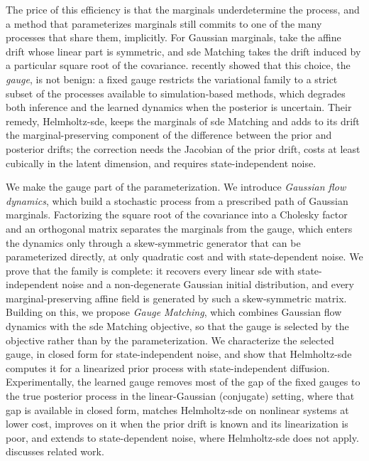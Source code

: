 \documentclass{article} %
\begin{document}
The price of this efficiency is that the marginals underdetermine the process, and a method that parameterizes marginals still commits to one of the many processes that share them, implicitly. For Gaussian marginals, \citet{course2023amortized,course2023state} take the affine drift whose linear part is symmetric, and \gls{sde} Matching \citep{bartosh2025sde} takes the drift induced by a particular square root of the covariance. \citet{smith2026closing} recently showed that this choice, the \emph{gauge}, is not benign: a fixed gauge restricts the variational family to a strict subset of the processes available to simulation-based methods, which degrades both inference and the learned dynamics when the posterior is uncertain. Their remedy, Helmholtz-\gls{sde}, keeps the marginals of \gls{sde} Matching and adds to its drift the marginal-preserving component of the difference between the prior and posterior drifts; the correction needs the Jacobian of the prior drift, costs at least cubically in the latent dimension, and requires state-independent noise.

We make the gauge part of the parameterization. We introduce \emph{Gaussian flow dynamics}, which build a stochastic process from a prescribed path of Gaussian marginals. Factorizing the square root of the covariance into a Cholesky factor and an orthogonal matrix separates the marginals from the gauge, which enters the dynamics only through a skew-symmetric generator that can be parameterized directly, at only quadratic cost and with state-dependent noise. We prove that the family is complete: it recovers every linear \gls{sde} with state-independent noise and a non-degenerate Gaussian initial distribution, and every marginal-preserving affine field is generated by such a skew-symmetric matrix. Building on this, we propose \emph{Gauge Matching}, which combines Gaussian flow dynamics with the \gls{sde} Matching objective, so that the gauge is selected by the objective rather than by the parameterization. We characterize the selected gauge, in closed form for state-independent noise, and show that Helmholtz-\gls{sde} computes it for a linearized prior process with state-independent diffusion. Experimentally, the learned gauge removes most of the gap of the fixed gauges to the true posterior process in the linear-Gaussian (conjugate) setting, where that gap is available in closed form, matches Helmholtz-\gls{sde} on nonlinear systems at lower cost, improves on it when the prior drift is known and its linearization is poor, and extends to state-dependent noise, where Helmholtz-\gls{sde} does not apply.  discusses related work.
\end{document}
